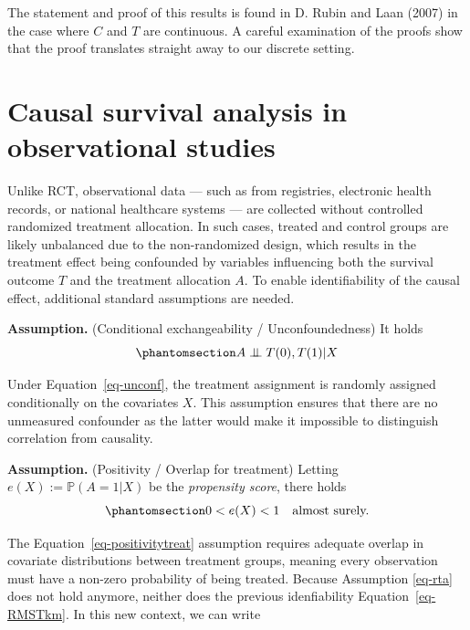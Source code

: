 \documentclass[
  11pt,
  a4paper,
]{article}
\theoremstyle{plain}
\theoremstyle{plain}
\theoremstyle{plain}
\theoremstyle{definition}
\theoremstyle{remark}
\begin{document}
The statement and proof of this results is found in D. Rubin and Laan
(2007) in the case where \(C\) and \(T\) are continuous. A careful
examination of the proofs show that the proof translates straight away
to our discrete setting.

\section{Causal survival analysis in observational
studies}\label{sec-theoryOBS}

Unlike RCT, observational data --- such as from registries, electronic
health records, or national healthcare systems --- are collected without
controlled randomized treatment allocation. In such cases, treated and
control groups are likely unbalanced due to the non-randomized design,
which results in the treatment effect being confounded by variables
influencing both the survival outcome \(T\) and the treatment allocation
\(A\). To enable identifiability of the causal effect, additional
standard assumptions are needed.

\textbf{Assumption.} (Conditional exchangeability / Unconfoundedness) It
holds \begin{equation}\phantomsection\label{eq-unconf}{ 
 A \perp\mkern-9.5mu\perp T(0),T(1) | X
}\end{equation}

Under Equation~\ref{eq-unconf}, the treatment assignment is randomly
assigned conditionally on the covariates \(X\). This assumption ensures
that there are no unmeasured confounder as the latter would make it
impossible to distinguish correlation from causality.

\textbf{Assumption.} (Positivity / Overlap for treatment) Letting
\(e(X) := \mathbb{P}(A=1|X)\) be the \emph{propensity score}, there
holds \begin{equation}\phantomsection\label{eq-positivitytreat}{ 
0 < e(X) <1 \quad \text{almost surely.}
}\end{equation}

The Equation~\ref{eq-positivitytreat} assumption requires adequate
overlap in covariate distributions between treatment groups, meaning
every observation must have a non-zero probability of being treated.
Because Assumption \ref{eq-rta} does not hold anymore, neither does the
previous idenfiability Equation~\ref{eq-RMSTkm}. In this new context, we
can write
\end{document}
